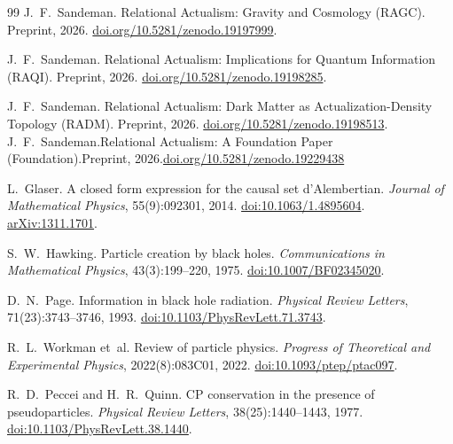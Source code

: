 \documentclass[11pt,a4paper]{article}
\begin{document}
\begin{thebibliography}{99}
J.~F.~Sandeman.
\newblock Relational Actualism: Gravity and Cosmology ({RAGC}).
\newblock Preprint, 2026.
\newblock \href{https://doi.org/10.5281/zenodo.19197999}{doi.org/10.5281/zenodo.19197999}.



J.~F.~Sandeman.
\newblock Relational Actualism: Implications for Quantum Information ({RAQI}).
\newblock Preprint, 2026.
\newblock \href{https://doi.org/10.5281/zenodo.19198285}{doi.org/10.5281/zenodo.19198285}.

J.~F.~Sandeman.
\newblock Relational Actualism: Dark Matter as Actualization-Density Topology ({RADM}).
\newblock Preprint, 2026.
\newblock \href{https://doi.org/10.5281/zenodo.19198513}{doi.org/10.5281/zenodo.19198513}.
J.~F.~Sandeman.\newblock Relational Actualism: A Foundation Paper ({Foundation}).\newblock Preprint, 2026.\newblock \href{https://doi.org/10.5281/zenodo.19229438}{doi.org/10.5281/zenodo.19229438}


L.~Glaser.
\newblock A closed form expression for the causal set d'Alembertian.
\newblock \emph{Journal of Mathematical Physics}, 55(9):092301, 2014.
\newblock \href{https://doi.org/10.1063/1.4895604}{doi:10.1063/1.4895604}.
\newblock \href{https://arxiv.org/abs/1311.1701}{arXiv:1311.1701}.

S.~W.~Hawking.
\newblock Particle creation by black holes.
\newblock \emph{Communications in Mathematical Physics}, 43(3):199--220, 1975.
\newblock \href{https://doi.org/10.1007/BF02345020}{doi:10.1007/BF02345020}.

D.~N.~Page.
\newblock Information in black hole radiation.
\newblock \emph{Physical Review Letters}, 71(23):3743--3746, 1993.
\newblock \href{https://doi.org/10.1103/PhysRevLett.71.3743}{doi:10.1103/PhysRevLett.71.3743}.

R.~L.~Workman et~al.
\newblock Review of particle physics.
\newblock \emph{Progress of Theoretical and Experimental Physics},
  2022(8):083C01, 2022.
\newblock \href{https://doi.org/10.1093/ptep/ptac097}{doi:10.1093/ptep/ptac097}.

R.~D.~Peccei and H.~R.~Quinn.
\newblock CP conservation in the presence of pseudoparticles.
\newblock \emph{Physical Review Letters}, 38(25):1440--1443, 1977.
\newblock \href{https://doi.org/10.1103/PhysRevLett.38.1440}{doi:10.1103/PhysRevLett.38.1440}.


\end{thebibliography}
\end{document}
